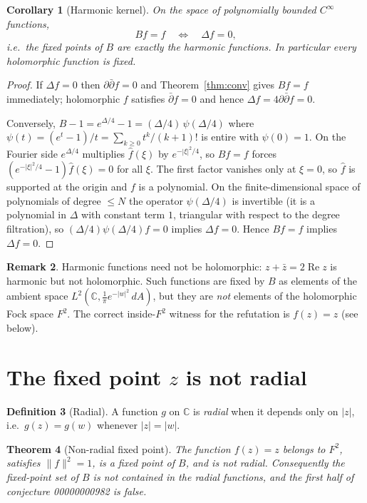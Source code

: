 \documentclass[11pt]{article}
\newtheorem{theorem}{Theorem}
\newtheorem{corollary}[theorem]{Corollary}
\theoremstyle{definition}
\newtheorem{definition}[theorem]{Definition}
\newtheorem{remark}[theorem]{Remark}
\newcommand{\dA}{\,dA}
\newcommand{\C}{\mathbb{C}}
\newcommand{\dd}{\partial}
\begin{document}
\begin{corollary}[Harmonic kernel]\label{cor:harmonic}
On the space of polynomially bounded $C^\infty$ functions,
\[
  Bf=f \quad\Longleftrightarrow\quad \Delta f=0,
\]
i.e.\ the fixed points of $B$ are exactly the harmonic functions. In
particular every holomorphic function is fixed.
\end{corollary}

\begin{proof}
If $\Delta f=0$ then $\dd\bar\dd f=0$ and Theorem~\ref{thm:conv} gives
$Bf=f$ immediately; holomorphic $f$ satisfies $\bar\dd f=0$ and hence
$\Delta f=4\dd\bar\dd f=0$.

Conversely, $B-1=e^{\Delta/4}-1=(\Delta/4)\,\psi(\Delta/4)$ where
$\psi(t)=(e^t-1)/t=\sum_{k\ge0}t^k/(k+1)!$ is entire with $\psi(0)=1$. On the
Fourier side $e^{\Delta/4}$ multiplies $\hat f(\xi)$ by $e^{-|\xi|^2/4}$, so
$Bf=f$ forces $(e^{-|\xi|^2/4}-1)\hat f(\xi)=0$ for all $\xi$. The first factor
vanishes only at $\xi=0$, so $\hat f$ is supported at the origin and $f$ is a
polynomial. On the finite-dimensional space of polynomials of degree $\le N$
the operator $\psi(\Delta/4)$ is invertible (it is a polynomial in $\Delta$ with
constant term $1$, triangular with respect to the degree filtration), so
$(\Delta/4)\psi(\Delta/4)f=0$ implies $\Delta f=0$. Hence $Bf=f$ implies
$\Delta f=0$.
\end{proof}

\begin{remark}
Harmonic functions need not be holomorphic: $z+\bar z=2\operatorname{Re}z$ is
harmonic but not holomorphic. Such functions are fixed by $B$ as elements of
the ambient space $L^2(\C,\frac1\pi e^{-|w|^2}\dA)$, but they are \emph{not}
elements of the holomorphic Fock space $F^2$. The correct inside-$F^2$ witness
for the refutation is $f(z)=z$ (see below).
\end{remark}

\section{The fixed point $z$ is not radial}

\begin{definition}[Radial]
A function $g$ on $\C$ is \emph{radial} when it depends only on $|z|$, i.e.\
$g(z)=g(w)$ whenever $|z|=|w|$.
\end{definition}

\begin{theorem}[Non-radial fixed point]\label{thm:nonradial}
The function $f(z)=z$ belongs to $F^2$, satisfies $\|f\|^2=1$, is a fixed point
of $B$, and is not radial. Consequently the fixed-point set of $B$ is not
contained in the radial functions, and the first half of conjecture
00000000982 is false.
\end{theorem}
\end{document}
